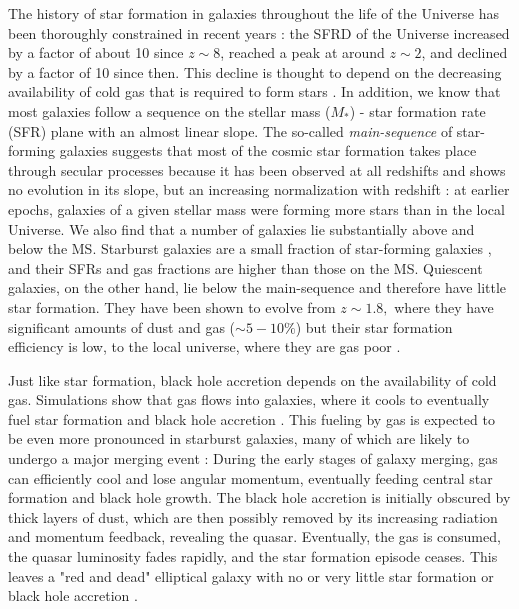     The history of star formation in galaxies throughout the life of the Universe has been thoroughly constrained in recent years \citep[see][for a review]{2014ARA&A..52..415M}: the SFRD of the Universe increased by a factor of about 10 since $z\sim8$, reached a peak at around $z\sim2$, and declined by a factor of 10 since then. This decline is thought to depend on the decreasing availability of cold gas that is required to form stars \citep[e.g.,][]{2016MNRAS.458L..14F}. In addition, we know that most galaxies follow a sequence on the stellar mass ($M_*$) - star formation rate (SFR) plane with an almost linear slope. The so-called \emph{\textup{main-sequence}} of star-forming galaxies \citep{2004MNRAS.351.1151B, 2007ApJ...670..156D, 2007A&A...468...33E, 2007ApJ...660L..43N, 2014MNRAS.443...19R, 2017MNRAS.465.3390A} suggests that most of the cosmic star formation takes place through secular processes \citep{2011ApJ...739L..40R} because it has been observed at all redshifts and shows no evolution in its slope, but an increasing normalization with redshift \citep{2015A&A...581A..54T, 2015A&A...575A..74S, 2016ApJ...817..118T}: at earlier epochs, galaxies of a given stellar mass were forming more stars than in the local Universe.
    We also find that a number of galaxies lie substantially above and below the MS.
    Starburst galaxies are a small fraction of star-forming galaxies \citep[$\sim2\%$][]{2011ApJ...739L..40R}, and their SFRs and gas fractions are higher than those on the MS. 
    Quiescent galaxies, on the other hand, lie below the main-sequence and therefore have little star formation. They have been shown to evolve from $z\sim1.8,$ where they have significant amounts of dust and gas ($\sim5-10\%$) but their star formation efficiency is low, to the local universe, where they are gas poor \citep{2018NatAs...2..239G}.
    
    Just like star formation, black hole accretion depends on the availability of cold gas. Simulations show that gas flows into galaxies, where it cools to eventually fuel star formation and black hole accretion \citep{2010MNRAS.407.1529H}. This fueling by gas is expected to be even more pronounced in starburst galaxies, many of which are likely to undergo a major merging event \citep{2005Natur.433..604D, 2008ApJS..175..356H}: During the early stages of galaxy merging, gas can efficiently cool and lose angular momentum, eventually feeding central star formation and black hole growth. 
    The black hole accretion is initially obscured by thick layers of dust, which are then possibly removed by its increasing radiation and momentum feedback, revealing the quasar. Eventually, the gas is consumed, the quasar luminosity fades rapidly, and the star formation episode ceases. This leaves a "red and dead" elliptical galaxy with no or very little star formation or black hole accretion \citep{2004ApJ...600..580G, 2006ApJ...650...42L}.
    
